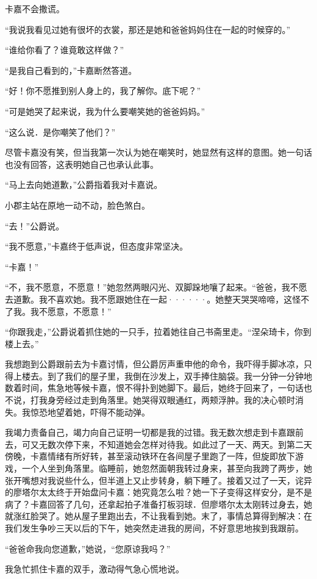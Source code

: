 \documentclass[12pt, UTF8]{ctexbook}
\begin{document}
\par 卡嘉不会撒谎。
\par “我说我看见过她有很坏的衣裳，那还是她和爸爸妈妈住在一起的时候穿的。”
\par “谁给你看了？谁竟敢这样做？”
\par “是我自己看到的，”卡嘉断然答道。
\par “好！你不愿推到别人身上的，我了解你。底下呢？”
\par “可是她哭了起来说，我为什么要嘲笑她的爸爸妈妈。”
\par “这么说．是你嘲笑了他们？”
\par 尽管卡嘉没有笑，但当我第一次认为她在嘲笑时，她显然有这样的意图。她一句话也没有回答，这表明她自己也承认此事。
\par “马上去向她道歉，”公爵指着我对卡嘉说。
\par 小郡主站在原地一动不动，脸色煞白。
\par “去！”公爵说。
\par “我不愿意，”卡嘉终于低声说，但态度非常坚决。
\par “卡嘉！”
\par “不，我不愿意，不愿意！”她忽然两眼闪光、双脚跺地嚷了起来。“爸爸，我不愿去道歉。我不喜欢她。我不愿跟她住在一起······。她整天哭哭啼啼，这怪不了我。我不愿意，不愿意！”
\par “你跟我走，”公爵说着抓住她的一只手，拉着她往自己书斋里走。“涅朵琦卡，你到楼上去。”
\par 我想跑到公爵跟前去为卡嘉讨情，但公爵厉声重申他的命令，我吓得手脚冰凉，只得上楼去。到了我们的屋子里，我倒在沙发上，双手捧住脑袋。我一分钟一分钟地数着时间，焦急地等候卡嘉，恨不得扑到她脚下。最后，她终于回来了，一句话也不说，打我身旁经过走到角落里。她哭得双眼通红，两颊浮肿。我的决心顿时消失。我惊恐地望着她，吓得不能动弹。
\par 我竭力责备自己，竭力向自己证明一切都是我的过错。我无数次想走到卡嘉跟前去，可又无数次停下来，不知道她会怎样对待我。如此过了一天、两天。到第二天傍晚，卡嘉情绪有所好转，甚至滚动铁环在各间屋子里跑了一阵，但旋即放下游戏，一个人坐到角落里。临睡前，她忽然面朝我转过身来，甚至向我跨了两步，她张开嘴想对我说些什么，但半道上又止步转身，躺下睡了。接着又过了一天，诧异的廖塔尔太太终于开始盘问卡嘉：她究竟怎么啦？她一下子变得这样安分，是不是病了？卡嘉回答了几句，还拿起拍子准备打板羽球．但廖塔尔太太刚转过身去，她就涨红脸哭了。她从屋子里跑出去，不让我看到她。末了，事情总算得到解决：在我们发生争吵三天以后的下午，她突然走进我的房间，不好意思地挨到我跟前。
\par “爸爸命我向您道歉，”她说，“您原谅我吗？”
\par 我急忙抓住卡嘉的双手，激动得气急心慌地说。
\end{document}
